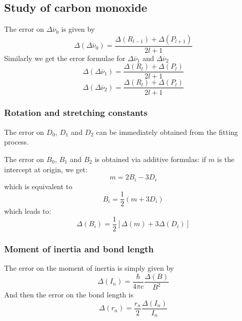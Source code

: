 \documentclass[12pt]{article}
\begin{document}
\subsection{Study of carbon monoxide}

The error on $\Delta \overline{\nu}_0$ is given by
\begin{equation}
    \Delta(\Delta \overline{\nu}_0) = \frac{\Delta(R_{l-1}) + \Delta (P_{l+1})}{2l+1}    
\end{equation}
Similarly we get the error formulae for $\Delta \overline{\nu}_1$ and $\Delta \overline{\nu}_2$
\begin{equation}
    \Delta(\Delta \overline{\nu}_1) = \frac{\Delta(R_{l}) + \Delta (P_{l})}{2l+1}
\end{equation}
\begin{equation}
    \Delta(\Delta \overline{\nu}_2) = \frac{\Delta(R_{l}) + \Delta (P_{l})}{2l+1}
\end{equation}


\subsubsection{Rotation and stretching constants}

The error on $D_0$, $D_1$ and $D_2$ can be immediately obtained from the fitting process. 

The error on $B_0$, $B_1$ and $B_2$ is obtained via additive formulas: if $m$ is the intercept at origin, we get:
\begin{equation}
    m = 2 B_i - 3 D_i
\end{equation}
which is equivalent to 
\begin{equation}
    B_i = \frac{1}{2}(m + 3 D_i)
\end{equation}
which leads to:
\begin{equation}
    \Delta (B_i) = \frac{1}{2}[ \Delta (m) + 3 \Delta (D_i) ]
\end{equation}

\subsubsection{Moment of inertia and bond length}

The error on the moment of inertia is simply given by
\begin{equation}
    \Delta (I_n) = \frac{\hbar}{4 \pi c } \frac{\Delta (B)}{B^2} 
\end{equation}
And then the error on the bond length is
\begin{equation}
    \Delta (r_n) = \frac{r_n}{2}\frac{\Delta (I_n)}{I_n}
\end{equation}
\end{document}

